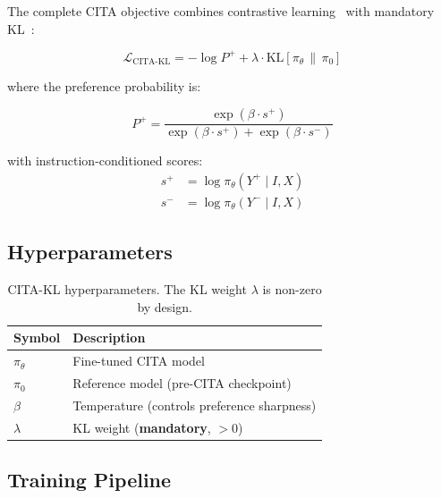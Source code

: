 The complete CITA objective combines contrastive learning~\cite{oord2018representation,gao2021simcse,radford2021learning} with mandatory KL~\cite{korbak2022rl}:

\begin{equation}
\mathcal{L}_{\text{CITA-KL}} = -\log P^+ + \lambda \cdot \text{KL}[\pi_\theta \,\|\, \pi_0]
\label{eq:cita_kl}
\end{equation}

where the preference probability is:

\begin{equation}
P^+ = \frac{\exp(\beta \cdot s^+)}{\exp(\beta \cdot s^+) + \exp(\beta \cdot s^-)}
\label{eq:preference_prob}
\end{equation}

with instruction-conditioned scores:
\begin{align}
s^+ &= \log \pi_\theta(Y^+ \mid I, X) \label{eq:score_pos} \\
s^- &= \log \pi_\theta(Y^- \mid I, X) \label{eq:score_neg}
\end{align}

\vspace{-2mm}
\subsection{Hyperparameters}
\label{sec:cita_hyperparams}

\begin{table}[H]
\centering
\small
\begin{tabular}{@{}ll@{}}
\toprule
\textbf{Symbol} & \textbf{Description} \\
\midrule
$\pi_\theta$ & Fine-tuned CITA model \\
\hline
$\pi_0$ & Reference model (pre-CITA checkpoint) \\
\hline
$\beta$ & Temperature (controls preference sharpness) \\
\hline
$\lambda$ & KL weight (\textbf{mandatory}, $> 0$) \\
\bottomrule
\end{tabular}
\caption{CITA-KL hyperparameters. The KL weight $\lambda$ is non-zero by design.}
\label{tab:cita_params}
\vspace{-4mm}
\end{table}

\vspace{-2mm}
\subsection{Training Pipeline}
\label{sec:training_pipeline}

